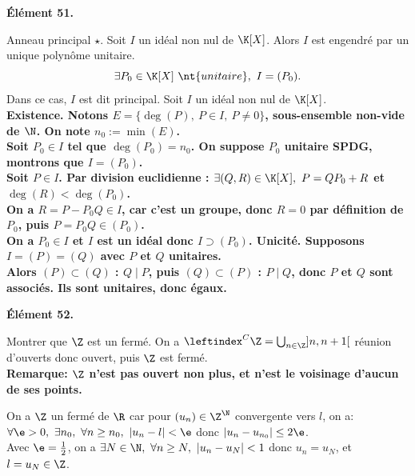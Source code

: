 \documentclass[11pt]{article}
\begin{document}
\bf{Élément 51.}

\begin{thm}{Anneau principal $\star$.}{}
    Soit $I$ un idéal non nul de $\K[X]$. Alors $I$ est engendré par un unique polynôme unitaire.
    \begin{equation*}
        \exists P_0 \in \K[X] ~\nt{unitaire}, ~ I=(P_0).
    \end{equation*}
    Dans ce cas, $I$ est dit principal.
    \tcblower
    Soit $I$ un idéal non nul de $\K[X]$.\\
    \bf{Existence.} Notons $E=\{\deg(P), ~ P\in I, ~ P\neq 0\}$, sous-ensemble non-vide de $\N$. On note $n_0:=\min(E)$.\\
    Soit $P_0\in I$ tel que $\deg(P_0)=n_0$. On suppose $P_0$ unitaire SPDG, montrons que $I=(P_0)$.\\
    \boxed{\subset} Soit $P\in I$. Par division euclidienne : $\exists (Q,R)\in\K[X], ~ P=QP_0+R$ et $\deg(R)<\deg(P_0)$.\\
    On a $R=P-P_0Q\in I$, car c'est un groupe, donc $R=0$ par définition de $P_0$, puis $P=P_0Q\in (P_0)$.\\
    \boxed{\supset} On a $P_0\in I$ et $I$ est un idéal donc $I \supset (P_0)$.\n
    \bf{Unicité.} Supposons $I=(P)=(Q)$ avec $P$ et $Q$ unitaires.\\
    Alors $(P)\subset(Q)$ : $Q \mid P$, puis $(Q)\subset(P)$ : $P\mid Q$, donc $P$ et $Q$ sont associés. Ils sont unitaires, donc égaux.
\end{thm}

\bf{Élément 52.}

\begin{ex}{}{}
    Montrer que $\Z$ est un fermé.
    \tcblower
    On a $\leftindex^C\Z=\bigcup_{n\in\Z}]n,n+1[$ réunion d'ouverts donc ouvert, puis $\Z$ est fermé.\\
    \bf{Remarque:} $\Z$ n'est pas ouvert non plus, et n'est le voisinage d'aucun de ses points.
\end{ex}

\begin{ex}{}{}
    On a $\Z$ un fermé de $\R$ car pour $(u_n)\in\Z^\N$ convergente vers $l$, on a:\\
    $\forall \e > 0, ~ \exists n_0, ~ \forall n \geq n_0, ~ |u_n-l|<\e$ donc $|u_n-u_{n_0}|\leq2\e$.\\
    Avec $\e=\frac{1}{2}$, on a $\exists N \in \N, ~ \forall n \geq N, ~ |u_n-u_N|<1$ donc $u_n=u_N$, et $l=u_N\in\Z$.
\end{ex}
\end{document}
